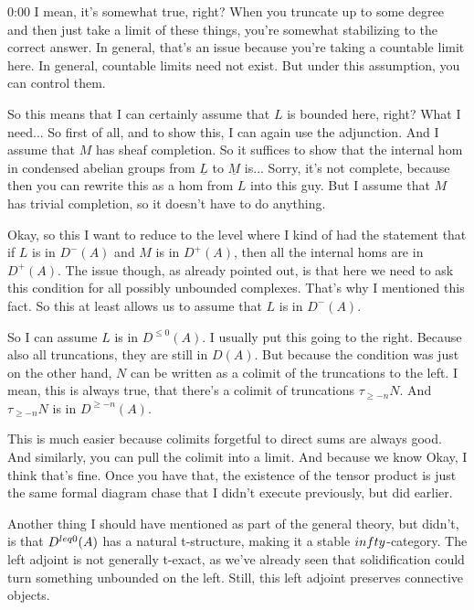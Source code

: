 \begin{unfinished}{0:00}
I mean, it's somewhat true, right? When you truncate up to some degree and then just take a limit of these things, you're somewhat stabilizing to the correct answer. In general, that's an issue because you're taking a countable limit here. In general, countable limits need not exist. But under this assumption, you can control them.

So this means that I can certainly assume that $L$ is bounded here, right? What I need... So first of all, and to show this, I can again use the adjunction. And I assume that $M$ has sheaf completion. So it suffices to show that the internal hom in condensed abelian groups from $\underline{L}$ to $\underline{M}$ is... Sorry, it's not complete, because then you can rewrite this as a hom from $L$ into this guy. But I assume that $M$ has trivial completion, so it doesn't have to do anything.

Okay, so this I want to reduce to the level where I kind of had the statement that if $L$ is in $D^-(A)$ and $M$ is in $D^+(A)$, then all the internal homs are in $D^+(A)$. The issue though, as already pointed out, is that here we need to ask this condition for all possibly unbounded complexes. That's why I mentioned this fact. So this at least allows us to assume that $L$ is in $D^-(A)$.

So I can assume $L$ is in $D^{\leq 0}(A)$. I usually put this going to the right. Because also all truncations, they are still in $D(A)$. But because the condition was just on the other hand, $N$ can be written as a colimit of the truncations to the left. I mean, this is always true, that there's a colimit of truncations $\tau_{\geq -n} N$. And $\tau_{\geq -n} N$ is in $D^{\geq -n}(A)$.

This is much easier because colimits forgetful to direct sums are always good. And similarly, you can pull the colimit into a limit. And because we know
Okay, I think that's fine. Once you have that, the existence of the tensor product is just the same formal diagram chase that I didn't execute previously, but did earlier.

Another thing I should have mentioned as part of the general theory, but didn't, is that $D^{\\leq 0}(A)$ has a natural t-structure, making it a stable $\\infty$-category. The left adjoint is not generally t-exact, as we've already seen that solidification could turn something unbounded on the left. Still, this left adjoint preserves connective objects.


\end{unfinished}
